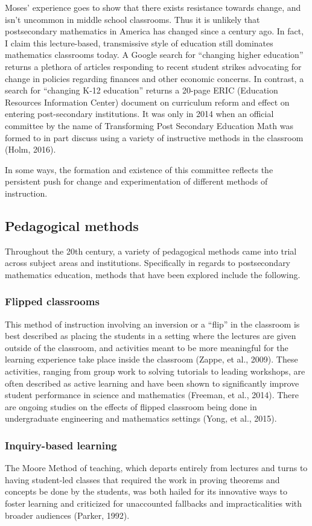Moses' experience goes to show that there exists resistance towards change, and isn't uncommon in middle school classrooms. Thus it is unlikely that postsecondary mathematics in America has changed since a century ago. In fact, I claim this lecture-based, transmissive style of education still dominates mathematics classrooms today. A Google search for ``changing higher education'' returns a plethora of articles responding to recent student strikes advocating for change in policies regarding finances and other economic concerns. In contrast, a search for ``changing K-12 education'' returns a 20-page ERIC (Education Resources Information Center) document on curriculum reform and effect on entering post-secondary institutions. It was only in 2014 when an official committee by the name of Transforming Post Secondary Education Math was formed to in part discuss using a variety of instructive methods in the classroom (Holm, 2016).

In some ways, the formation and existence of this committee reflects the  persistent push for change and experimentation of different methods of instruction.
\subsection{Pedagogical methods}
Throughout the 20th century, a variety of pedagogical methods came into trial across subject areas and institutions. Specifically in regards to postsecondary mathematics education, methods that have been explored include the following.

\subsubsection{Flipped classrooms}
This method of instruction involving an inversion or a ``flip'' in the classroom is best described as placing the students in a setting where the lectures are given outside of the classroom, and activities meant to be more meaningful for the learning experience take place inside the classroom (Zappe, et al., 2009). These activities, ranging from group work to solving tutorials to leading workshops, are often described as active learning and have been shown to significantly improve student performance in science and mathematics (Freeman, et al., 2014). There are ongoing studies on the effects of flipped classroom being done in undergraduate engineering and mathematics settings (Yong, et al., 2015).

\subsubsection{Inquiry-based learning}
The Moore Method of teaching, which departs entirely from lectures and turns to having student-led classes that required the work in proving theorems and concepts be done by the students, was both hailed for its innovative ways to foster learning and criticized for unaccounted fallbacks and impracticalities with broader audiences (Parker, 1992).

